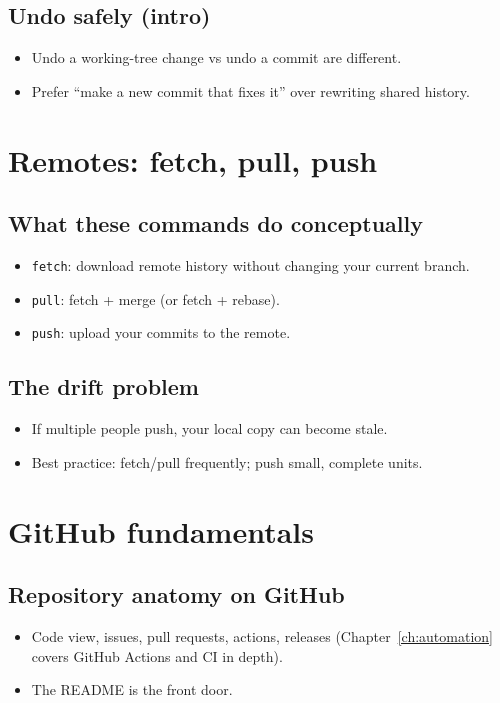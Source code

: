 \subsection{Undo safely (intro)}
\begin{itemize}
\item Undo a working-tree change vs undo a commit are different.
\item Prefer ``make a new commit that fixes it'' over rewriting shared history.
\end{itemize}

\section{Remotes: fetch, pull, push}
\subsection{What these commands do conceptually}
\begin{itemize}
\item \texttt{fetch}: download remote history without changing your current branch.
\item \texttt{pull}: fetch + merge (or fetch + rebase).
\item \texttt{push}: upload your commits to the remote.
\end{itemize}

\subsection{The drift problem}
\begin{itemize}
\item If multiple people push, your local copy can become stale.
\item Best practice: fetch/pull frequently; push small, complete units.
\end{itemize}

\section{GitHub fundamentals}
\subsection{Repository anatomy on GitHub}
\begin{itemize}
\item Code view, issues, pull requests, actions, releases (Chapter~\ref{ch:automation} covers GitHub Actions and CI in depth).
\item The README is the front door.
\end{itemize}

